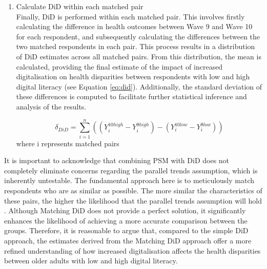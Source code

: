 \begin{enumerate}[wide=0pt, leftmargin=*, labelwidth=0pt, labelindent=\parindent, itemindent=0pt]
    \item Calculate DiD within each matched pair \\
    Finally, DiD is performed within each matched pair. This involves firstly calculating the difference in health outcomes between Wave 9 and Wave 10 for each respondent, and subsequently calculating the differences between the two matched respondents in each pair. This process results in a distribution of DiD estimates across all matched pairs. From this distribution, the mean is calculated, providing the final estimate of the impact of increased digitalisation on health disparities between respondents with low and high digital literacy (see Equation \ref{eq:did}). Additionally, the standard deviation of these differences is computed to facilitate further statistical inference and analysis of the results.

    \begin{equation}
        \label{eq:did}
        \delta_{DiD} = \sum_{i=1}^{n} \left( (Y_{i}^{10high} - Y_{i}^{9high}) - (Y_{i}^{10low} - Y_{i}^{9low}) \right)
    \end{equation}
    where i represents matched pairs
\end{enumerate}

It is important to acknowledge that combining PSM with DiD does not completely eliminate concerns regarding the parallel trends assumption, which is inherently untestable. The fundamental approach here is to meticulously match respondents who are as similar as possible. The more similar the characteristics of these pairs, the higher the likelihood that the parallel trends assumption will hold \parencite{abadie_matching_2016}. Although Matching DiD does not provide a perfect solution, it significantly enhances the likelihood of achieving a more accurate comparison between the groups. Therefore, it is reasonable to argue that, compared to the simple DiD approach, the estimates derived from the Matching DiD approach offer a more refined understanding of how increased digitalisation affects the health disparities between older adults with low and high digital literacy.
